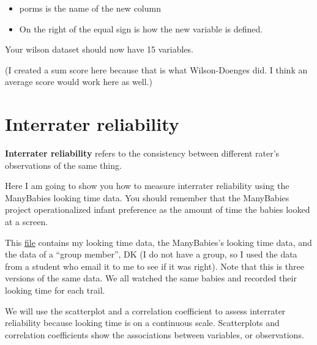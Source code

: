 \documentclass[
]{book}
\newenvironment{Shaded}{\begin{snugshade}}{\end{snugshade}}
\newcommand{\DataTypeTok}[1]{\textcolor[rgb]{0.13,0.29,0.53}{#1}}
\newcommand{\KeywordTok}[1]{\textcolor[rgb]{0.13,0.29,0.53}{\textbf{#1}}}
\newcommand{\NormalTok}[1]{#1}
\newcommand{\OperatorTok}[1]{\textcolor[rgb]{0.81,0.36,0.00}{\textbf{#1}}}
\newcommand{\StringTok}[1]{\textcolor[rgb]{0.31,0.60,0.02}{#1}}
\providecommand{\tightlist}{%
  \setlength{\itemsep}{0pt}\setlength{\parskip}{0pt}}
\begin{document}
\begin{Shaded}
\end{Shaded}

\begin{itemize}
\tightlist
\item
  porms is the name of the new column\\
\item
  On the right of the equal sign is how the new variable is defined.
\end{itemize}

Your wilson dataset should now have 15 variables.

(I created a sum score here because that is what Wilson-Doenges did. I think an average score would work here as well.)

\hypertarget{interrater-reliability}{%
\chapter{Interrater reliability}\label{interrater-reliability}}

\textbf{Interrater reliability} refers to the consistency between different rater's observations of the same thing.

Here I am going to show you how to measure interrater reliability using the ManyBabies looking time data. You should remember that the ManyBabies project operationalized infant preference as the amount of time the babies looked at a screen.

This \href{https://docs.google.com/spreadsheets/d/1Oth1KPJmQaqoQsrt09ADwI9Qyn9MsvEWMAQfj60ici8/edit?usp=sharing}{file} contains my looking time data, the ManyBabies's looking time data, and the data of a ``group member'', DK (I do not have a group, so I used the data from a student who email it to me to see if it was right). Note that this is three versions of the same data. We all watched the same babies and recorded their looking time for each trail.

We will use the scatterplot and a correlation coefficient to assess interrater reliability because looking time is on a continuous scale. Scatterplots and correlation coefficients show the associations between variables, or observations.
\end{document}
